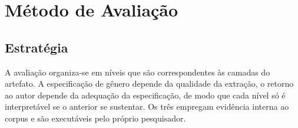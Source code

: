 


\chapter{Método de Avaliação}\label{chap:avaliacao}





\section{Estratégia}
\label{sec:estrategia-avaliacao}
 
A avaliação organiza-se em níveis que são correspondentes às camadas do artefato. A especificação de gênero depende da qualidade da extração, o retorno ao autor depende da adequação da especificação, de modo que cada nível só é interpretável se o anterior se sustentar. Os três empregam evidência interna ao corpus e são executáveis pelo próprio pesquisador.
 
 
